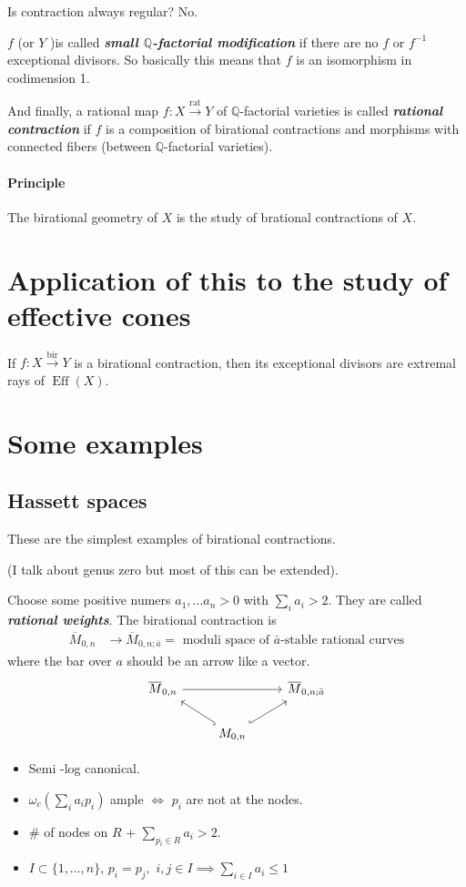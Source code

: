 \begin{question}[Misha]
	Is contraction always regular? No.
\end{question}

$f$ (or $Y$ )is called \textit{\textbf{small $\mathbb{Q}$-factorial modification}} if there are no $f$ or $f^{-1}$ exceptional divisors. So basically this means that $f$ is an isomorphism in codimension 1.

And finally, a rational map $f:X\overset{\operatorname{rat}}{\longrightarrow} Y$ of $\mathbb{Q}$-factorial varieties is called \textit{\textbf{rational contraction}} if $f$ is a composition of birational contractions and morphisms with connected fibers (between $\mathbb{Q}$-factorial varieties).

\paragraph{Principle} The birational geometry of $X$ is the study of brational contractions of $X$.

\section{Application of this to the study of effective cones}

If $f:X\overset{\operatorname{bir}}{\longrightarrow}Y$ is a birational contraction, then its exceptional divisors are extremal rays of $\operatorname{E f f}(X)$.

\section{Some examples}
\subsection{Hassett spaces}
These are the simplest examples of birational contractions.

(I talk about genus zero but most of this can be extended).

Choose some positive numers $a_1,\ldots a_n>0$ with  $\sum_{i}a_i>2$. They are called \textit{\textbf{rational weights}}. The birational contraction is
\begin{align*}
	\overline{M}_{0,n}  &\longrightarrow \overline{M}_{0,n;\bar{a}}=\text{ moduli space of $\bar{a}$-stable rational curves} 
\end{align*}
where the bar over $a$ should be an arrow like a vector.
\[\begin{tikzcd}
\overline{M}_{0,n}\arrow[rr]&&\overline{M}_{0,n;\bar{a}}\\
&M_{0,n}\arrow[ul,hook]\arrow[ur,hook,swap]
\end{tikzcd}\]
\begin{itemize}
	\item Semi -log canonical.
 \item  $\omega_c\left( \sum_{i}a_i p_i \right) $ ample $ \iff$ $p_i$ are not at the nodes.
\item $\#$ of nodes on  $R$ + $\sum_{p_i\in R}a_i>2$.
\item $I\subset \{1,\ldots,n\}$, $p_i=p_j,$ $i,j\in I\implies \sum_{i \in I}a_i\leq 1$
\end{itemize}

